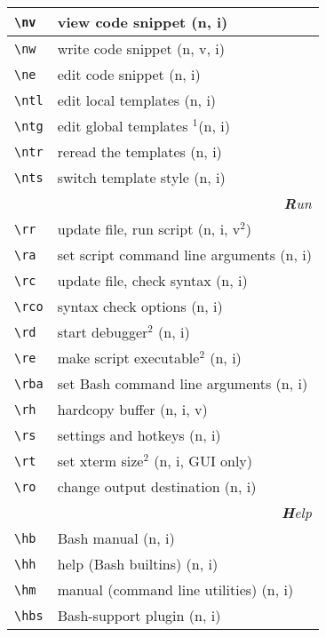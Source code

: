\documentclass[oneside,11pt,a4paper,DIV18]{scrartcl}
\begin{document}
\begin{center}
\begin{tabular}[]{|p{11mm}|p{59mm}|}
\hline \verb'\nv'  & view code snippet          \hfill (n, i)\\
\hline \verb'\nw'  & write code snippet         \hfill (n, v, i)\\
\hline \verb'\ne'  & edit code snippet          \hfill (n, i)\\
%
\hline \verb'\ntl' & edit local templates      \hfill (n, i)\\
\hline \verb'\ntg' & edit global templates $^1$\hfill (n, i)\\
\hline \verb'\ntr' & reread the templates      \hfill (n, i)\\
\hline \verb'\nts' & switch template style     \hfill (n, i)\\
\hline
\hline
\multicolumn{2}{|r|}{\textsl{\textbf{R}un}}\\
\hline \verb'\rr'  & update file, run script           \hfill (n, i, v$^2$)\\
\hline \verb'\ra'  & set script command line arguments \hfill (n, i)\\
\hline \verb'\rc'  & update file, check syntax         \hfill (n, i)\\
\hline \verb'\rco' & syntax check options              \hfill (n, i)\\
\hline \verb'\rd'  & start debugger$^2$                \hfill (n, i)\\
\hline \verb'\re'  & make script executable$^2$        \hfill (n, i)\\
\hline \verb'\rba' & set Bash command line arguments   \hfill (n, i)\\
\hline \verb'\rh'  & hardcopy buffer                   \hfill (n, i, v)\\
\hline \verb'\rs'  & settings and hotkeys              \hfill (n, i)\\
\hline \verb'\rt'  & set xterm size$^2$                \hfill (n, i, GUI only)\\
\hline \verb'\ro'  & change output destination         \hfill (n, i)\\
\hline
\hline 
\multicolumn{2}{|r|}{\textsl{\textbf{H}elp}}\\
\hline \verb'\hb'  & Bash manual                     \hfill (n, i)\\
\hline \verb'\hh'  & help (Bash builtins)            \hfill (n, i)\\
\hline \verb'\hm'  & manual (command line utilities) \hfill (n, i)\\
\hline \verb'\hbs' & Bash-support plugin             \hfill (n, i)\\

\end{tabular}
\end{center}
\end{document}
